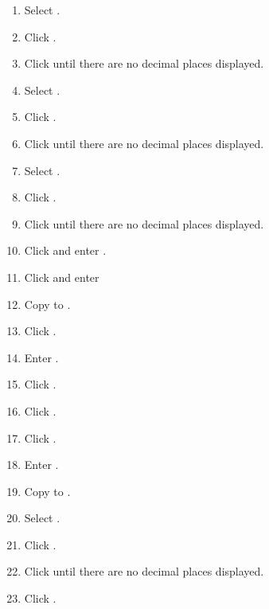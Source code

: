 \begin{enumerate}
	\item Select .
	\item Click .
	\item Click  until there are no decimal places displayed.

	\item Select .
	\item Click .
	\item Click  until there are no decimal places displayed.

	\item Select .
	\item Click .
	\item Click  until there are no decimal places displayed.

	\item Click  and enter .
	\item Click  and enter 
	\item Copy  to .

	\item Click . 
	\item Enter . 
	\item Click .
	\item Click .

	\item Click .
	\item Enter .
	\item Copy  to .

	\item Select .
	\item Click .
	\item Click  until there are no decimal places displayed.
	\item Click .
	

\end{enumerate}
